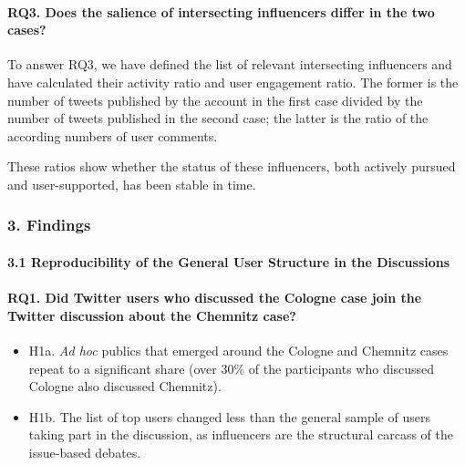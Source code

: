 \paragraph{RQ3. Does the salience of intersecting influencers differ in the two cases?}

To answer RQ3, we have defined the list of relevant intersecting influencers and have calculated their activity ratio and user engagement ratio. The former is the number of tweets published by the account in the first case divided by the number of tweets published in the second case; the latter is the ratio of the according numbers of user comments.

These ratios show whether the status of these influencers, both actively pursued and user-supported, has been stable in time.

\subsubsection{3. Findings}

\paragraph{3.1 Reproducibility of the General User Structure in the Discussions}

\paragraph{RQ1. Did Twitter users who discussed the Cologne case join the Twitter discussion about the Chemnitz case?}

\begin{itemize}
	\item H1a. \textit{Ad hoc} publics that emerged around the Cologne and Chemnitz cases repeat to a significant share (over 30\% of the participants who discussed Cologne also discussed Chemnitz).
	\item H1b. The list of top users changed less than the general sample of users taking part in the discussion, as influencers are the structural carcass of the issue-based debates.
\end{itemize}

